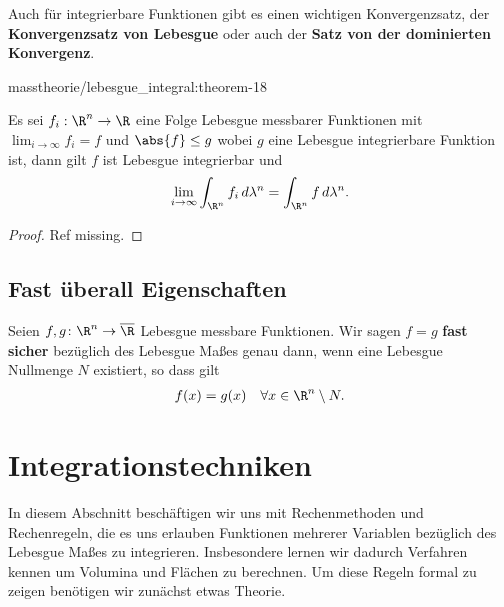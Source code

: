 \documentclass[letterpaper,10pt,german]{jupyterBook}
\begin{document}
\par
Auch für integrierbare Funktionen gibt es einen wichtigen Konvergenzsatz, der \textbf{Konvergenzsatz von Lebesgue} oder auch der \textbf{Satz von der dominierten Konvergenz}.
\begin{theorem}{}{masstheorie/lebesgue_integral:theorem-18}



\par
Es sei \(f_i:\R^n\to\R\) eine Folge Lebesgue messbarer Funktionen mit \(\lim_{i\to\infty} f_i =f\) und \(\abs{f}\leq g\) wobei \(g\) eine Lebesgue integrierbare Funktion ist, dann gilt \(f\) ist Lebesgue integrierbar und
\begin{align*}
\lim_{i\to\infty} \int_{\R^n} f_i\, d\lambda^n = \int_{\R^n} f\, d\lambda^n.
\end{align*}\end{theorem}

\begin{proof}
 Ref missing.
\end{proof}


\subsection{Fast überall Eigenschaften}
\begin{definition}{}{}\label{masstheorie/lebesgue_integral:definition-19}



\par
Seien \(f,g \colon \R^n \rightarrow \overline{\R}\) Lebesgue messbare Funktionen.
Wir sagen \(f = g\) \textbf{fast sicher} bezüglich des Lebesgue Maßes genau dann, wenn eine Lebesgue Nullmenge \(N\) existiert, so dass gilt
\begin{align*}
f(x) = g(x) \quad \forall x \in \R^n \setminus N.
\end{align*}\end{definition}


\section{Integrationstechniken}
\label{\detokenize{masstheorie/integrationstechnik:integrationstechniken}}\label{\detokenize{masstheorie/integrationstechnik::doc}}
\par
In diesem Abschnitt beschäftigen wir uns mit Rechenmethoden und Rechenregeln, die es uns erlauben Funktionen mehrerer Variablen bezüglich des Lebesgue Maßes zu integrieren. Insbesondere lernen wir dadurch Verfahren kennen um Volumina und Flächen zu berechnen. Um diese Regeln formal zu zeigen benötigen wir zunächst etwas Theorie.
\end{document}
